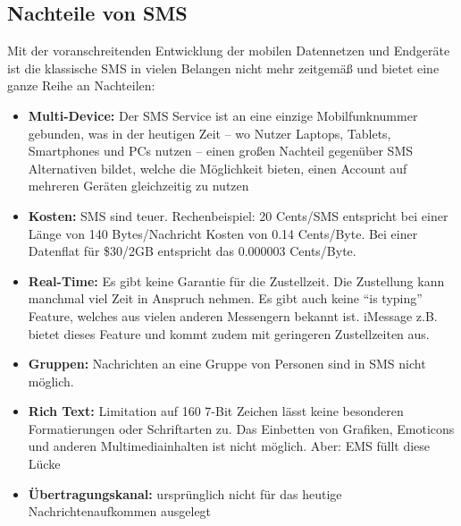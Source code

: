 \documentclass[german,12pt,a4paper]{article}
\begin{document}


\subsection{Nachteile von SMS}
Mit der voranschreitenden Entwicklung der mobilen Datennetzen und Endgeräte ist die klassische SMS in vielen Belangen
nicht mehr zeitgemäß und bietet eine ganze Reihe an Nachteilen:
\begin{itemize}
	\item \textbf{Multi-Device:} Der SMS Service ist an eine einzige Mobilfunknummer gebunden, was in der heutigen Zeit -- 
		wo Nutzer Laptops, Tablets, Smartphones und PCs nutzen -- einen großen Nachteil gegenüber SMS Alternativen 
		bildet, welche die Möglichkeit bieten, einen Account auf mehreren Geräten gleichzeitig zu nutzen
	\item \textbf{Kosten:} SMS sind teuer. Rechenbeispiel: 20 Cents/SMS entspricht bei einer Länge von 140 Bytes/Nachricht Kosten 
		von 0.14 Cents/Byte. Bei einer Datenflat für \$30/2GB entspricht das 0.000003 Cents/Byte.
	\item \textbf{Real-Time:} Es gibt keine Garantie für die Zustellzeit. Die Zustellung kann manchmal viel Zeit in Anspruch nehmen. 
		Es gibt auch keine ``is typing'' Feature, welches aus vielen anderen Messengern bekannt ist. iMessage z.B. bietet 
		dieses Feature und kommt zudem mit geringeren Zustellzeiten aus.
	\item \textbf{Gruppen:} Nachrichten an eine Gruppe von Personen sind in SMS nicht möglich.
	\item \textbf{Rich Text:} Limitation auf 160 7-Bit Zeichen lässt keine besonderen Formatierungen oder Schriftarten zu. Das Einbetten
		von Grafiken, Emoticons und anderen Multimediainhalten ist nicht möglich. Aber: EMS füllt diese Lücke
	\item \textbf{Übertragungskanal:} ursprünglich nicht für das heutige 
		Nachrichtenaufkommen ausgelegt
\end{itemize}
\end{document}
